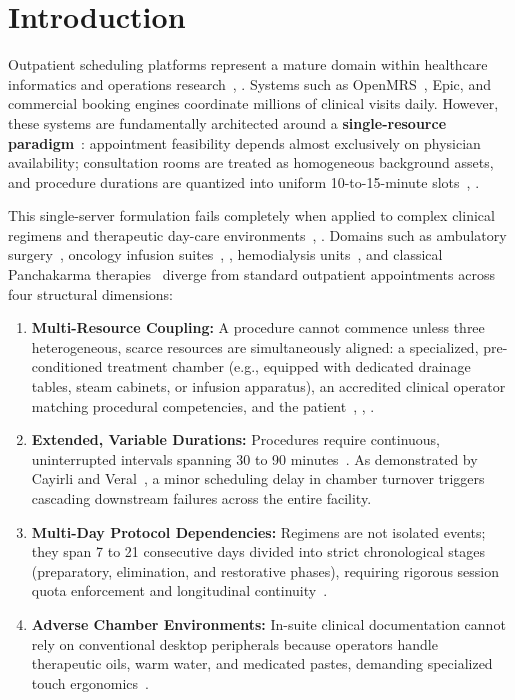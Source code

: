 \documentclass[conference]{IEEEtran}
\begin{document}
\section{Introduction}

Outpatient scheduling platforms represent a mature domain within healthcare informatics and operations research~\cite{cayirli2003outpatient}, \cite{gupta2008appointment}. Systems such as OpenMRS~\cite{mamlin2006cooking}, Epic, and commercial booking engines coordinate millions of clinical visits daily. However, these systems are fundamentally architected around a \textbf{single-resource paradigm}~\cite{gupta2008appointment}: appointment feasibility depends almost exclusively on physician availability; consultation rooms are treated as homogeneous background assets, and procedure durations are quantized into uniform 10-to-15-minute slots~\cite{cayirli2003outpatient}, \cite{vanessen2014breaking}.

This single-server formulation fails completely when applied to complex clinical regimens and therapeutic day-care environments~\cite{vanessen2014breaking}, \cite{samudra2016scheduling}. Domains such as ambulatory surgery~\cite{schimmelpfeng2021operating}, oncology infusion suites~\cite{heshmat2018two}, \cite{liang2021robust}, hemodialysis units~\cite{gaggero2021decision}, and classical Panchakarma therapies~\cite{singh2008holistic} diverge from standard outpatient appointments across four structural dimensions:
\begin{enumerate}
    \item \textbf{Multi-Resource Coupling:} A procedure cannot commence unless three heterogeneous, scarce resources are simultaneously aligned: a specialized, pre-conditioned treatment chamber (e.g., equipped with dedicated drainage tables, steam cabinets, or infusion apparatus), an accredited clinical operator matching procedural competencies, and the patient~\cite{vanessen2014breaking}, \cite{schimmelpfeng2021operating}, \cite{gaggero2021decision}.
    \item \textbf{Extended, Variable Durations:} Procedures require continuous, uninterrupted intervals spanning 30 to 90 minutes~\cite{singh2008holistic}. As demonstrated by Cayirli and Veral~\cite{cayirli2003outpatient}, a minor scheduling delay in chamber turnover triggers cascading downstream failures across the entire facility.
    \item \textbf{Multi-Day Protocol Dependencies:} Regimens are not isolated events; they span 7 to 21 consecutive days divided into strict chronological stages (preparatory, elimination, and restorative phases), requiring rigorous session quota enforcement and longitudinal continuity~\cite{singh2008holistic}.
    \item \textbf{Adverse Chamber Environments:} In-suite clinical documentation cannot rely on conventional desktop peripherals because operators handle therapeutic oils, warm water, and medicated pastes, demanding specialized touch ergonomics~\cite{mamlin2006cooking}.
\end{enumerate}
\end{document}
